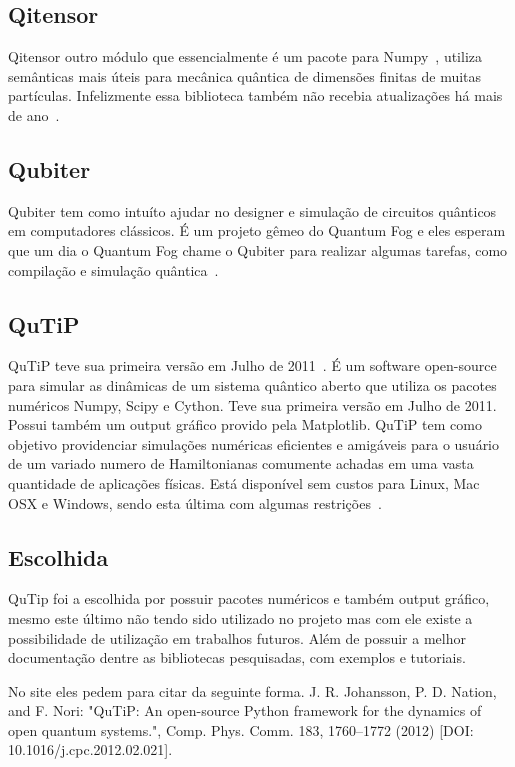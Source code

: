 \documentclass[a4paper, 12pt, oneside]{book}
\begin{document}
\subsection{Qitensor}
Qitensor outro módulo que essencialmente é um pacote para Numpy~\cite{numpy}, utiliza semânticas mais úteis para mecânica quântica de dimensões finitas de muitas partículas. Infelizmente essa biblioteca também não recebia atualizações há mais de ano~\cite{qitensor}.
\subsection{Qubiter}
Qubiter tem como intuíto ajudar no designer e simulação de circuitos quânticos em computadores clássicos. É um projeto gêmeo do Quantum Fog e eles esperam que um dia o Quantum Fog chame o Qubiter para realizar algumas tarefas, como compilação e simulação quântica~\cite{qubiter}.	

\subsection{QuTiP}
QuTiP teve sua primeira versão em Julho de 2011~\cite{qutipchangelog}. É um software open-source para simular as dinâmicas de um sistema quântico aberto que utiliza os pacotes numéricos Numpy, Scipy e Cython. Teve sua primeira versão em Julho de 2011. Possui também um output gráfico provido pela Matplotlib. QuTiP tem como objetivo providenciar simulações numéricas eficientes e amigáveis para o usuário de um variado numero de Hamiltonianas comumente achadas em uma vasta quantidade de aplicações físicas. Está disponível sem custos para Linux, Mac OSX e Windows, sendo esta última com algumas restrições~\cite{qutip.org}. \cite{teste}

\subsection{Escolhida}
QuTip foi a escolhida por possuir pacotes numéricos e também output gráfico, mesmo este último não tendo sido utilizado no projeto mas com ele existe a possibilidade de utilização em trabalhos futuros. Além de possuir a melhor documentação dentre as bibliotecas pesquisadas, com exemplos e tutoriais.

No site eles pedem para citar da seguinte forma.
J. R. Johansson, P. D. Nation, and F. Nori: "QuTiP: An open-source Python framework for the dynamics of open quantum systems.", Comp. Phys. Comm. 183, 1760–1772 (2012) [DOI: 10.1016/j.cpc.2012.02.021]. 
\end{document}
